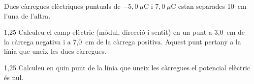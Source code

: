 Dues càrregues elèctriques puntuals de $-5,0\ \mu\mathrm{C}$ i $7,0\ \mu\mathrm{C}$ estan separades 10~cm l'una de l'altra.

\begin{apartat}{1,25}
Calculeu el camp elèctric (mòdul, direcció i sentit) en un punt a 3,0~cm de la càrrega negativa i a 7,0~cm de la càrrega positiva. Aquest punt pertany a la línia que uneix les dues càrregues.
\end{apartat}

\begin{apartat}{1,25}
Calculeu en quin punt de la línia que uneix les càrregues el potencial elèctric és nul.
\end{apartat}

